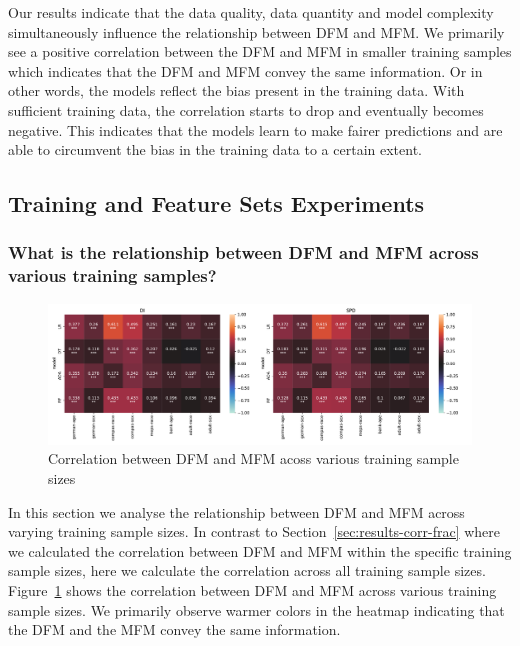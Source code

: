 \documentclass{article}
\begin{document}
Our results indicate that the data quality, data quantity and model
complexity simultaneously influence the relationship between DFM and
MFM. We primarily see a positive correlation between the DFM and MFM
in smaller training samples which indicates that the DFM and MFM
convey the same information. Or in other words, the models reflect the
bias present in the training data. With sufficient training data, the
correlation starts to drop and eventually becomes negative. This
indicates that the models learn to make fairer predictions and are
able to circumvent the bias in the training data to a certain extent.



\subsection{Training and Feature Sets Experiments}\label{sec:results-training-feature-sets}
\subsubsection{What is the relationship between DFM and MFM across
  various training samples?}\label{sec:results-training-sets}

\begin{figure}
  \centering
  \includegraphics[width=0.95\linewidth]{heatmap--corr--frac.pdf}
  \caption{Correlation between DFM and MFM acoss various training
    sample sizes}
  \label{fig:heatmap--corr--frac}
\end{figure}

In this section we analyse the relationship between DFM and MFM across
varying training sample sizes. In contrast to
Section \ref{sec:results-corr-frac} where we calculated the
correlation between DFM and MFM within the specific training sample
sizes, here we calculate the correlation across all training sample
sizes. Figure \ref{fig:heatmap--corr--frac} shows the correlation
between DFM and MFM across various training sample sizes. We primarily
observe warmer colors in the heatmap indicating that the DFM and the
MFM convey the same information.
\end{document}
